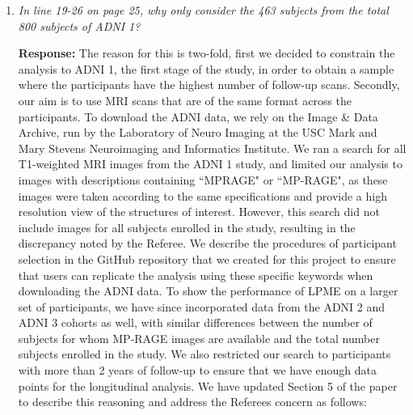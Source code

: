 \documentclass[12pt]{article}
\theoremstyle{definition}
\begin{document}
\begin{enumerate}
{\bf Response:} Yes, in the cases highlighted by the Referee, the discrepancies between the true manifold and the observed data are due to high levels of noise. While noise to this extent is likely not present in the imaging data we are directly interested in, we sought to understand how the LPME method would perform in cases where this level of noise is present. Regarding the plot when time = 0.9, we cannot say with complete certainty why the LPME estimate is bi-modal or shows less smoothness than the other methods, but it is likely that these characteristics result from the temporal smoothing, which will cause the LPME estimate to incorporate information from adjacent time points, which were not shown in this figure due to space constraints. Note that since the simulations have been rerun with an updated data generation process to address other comments, Figure 3 has been changed to reflect the new results.


\item \textit{In line 19-26 on page 25, why only consider the 463 subjects from the total 800 subjects of ADNI 1?}

  {\bf Response:} The reason for this is two-fold, first we decided to constrain the analysis to ADNI 1, the first stage of the study, in order to obtain a sample where the participants have the highest number of follow-up scans. Secondly, our aim is to use MRI scans that are of the same format across the participants. To download the ADNI data, we rely on the Image \& Data Archive, run by the Laboratory of Neuro Imaging at the USC Mark and Mary Stevens Neuroimaging and Informatics Institute. We ran a search for all T1-weighted MRI images from the ADNI 1 study, and limited our analysis to images with descriptions containing ``MPRAGE" or ``MP-RAGE", as these images were taken according to the same specifications and provide a high resolution view of the structures of interest. However, this search did not include images for all subjects enrolled in the study, resulting in the discrepancy noted by the Referee. We describe the procedures of participant selection in the GitHub repository that we created for this project to ensure that users can replicate the analysis using these specific keywords when downloading the ADNI data. To show the performance of LPME on a larger set of participants,  we  have since incorporated data from the ADNI 2 and ADNI 3 cohorts as well, with similar differences between the number of subjects for whom MP-RAGE images are available and the total number subjects enrolled in the study. We also restricted our search to participants with more than 2 years of follow-up to ensure that we have enough data points for the longitudinal analysis. We have updated Section 5 of the paper to describe this reasoning and address the Referees concern as follows: 


\end{enumerate}
\end{document}
